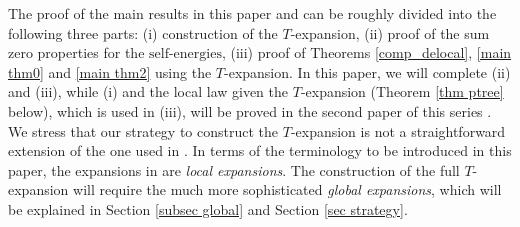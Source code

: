 \documentclass{article}
\newcommand{\1}{\mathds{1}}
\numberwithin{equation}{section}
\newcommand{\self}{\text{self-energy}}
\newcommand{\selfs}{\text{self-energies}}
\newcommand{\renormal}{\text{self-energy renormalization}}
\theoremstyle{plain} %
\theoremstyle{remark}
\newcommand{\cor}{\color{red}}
\begin{document}
 
The proof of the main results in this paper and \cite{PartII_high} can be roughly divided into the following three parts:
(i) construction of the $T$-expansion, (ii)  proof of the sum zero properties for the $\selfs$,  %
(iii) proof of Theorems \ref{comp_delocal}, \ref{main thm0} and \ref{main thm2} using the $T$-expansion. %
In this paper, we will complete  (ii) and (iii), while  (i) and the local law given the $T$-expansion (Theorem \ref{thm ptree} below), which is used in (iii), will be proved in the second paper of this series \cite{PartII_high}.
We stress that our strategy to construct the $T$-expansion is not  a straightforward extension of the one used  in \cite{EKY_Average, PartIII}. In terms of the terminology to be  introduced in this paper, the expansions in \cite{EKY_Average, PartIII} are  \emph{local expansions}. The  construction of the full $T$-expansion will require the much more sophisticated \emph{global expansions}, which will be explained in  %
 Section \ref{subsec global} and Section \ref{sec strategy}.
 
 
 
 
 
 \medskip
 
\end{document}
